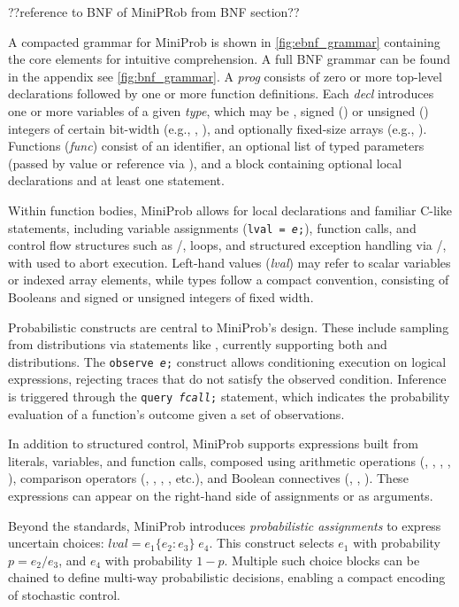 ??reference to BNF of MiniPRob from BNF section??

A compacted grammar for MiniProb is shown in \ref{fig:ebnf_grammar} containing the core elements for intuitive comprehension.
A full BNF grammar can be found in the appendix see \ref{fig:bnf_grammar}.
A \emph{prog} consists of zero or more top-level declarations followed by one or more function definitions. Each \emph{decl} introduces one or more variables of a
given \emph{type}, which may be , signed () or unsigned () integers of certain bit-width (e.g., , ),
and optionally fixed-size arrays (e.g., ). Functions (\emph{func}) consist of an identifier, an optional list of typed parameters (passed by value or
reference via \code{\&}), and a block containing optional local declarations and at least one statement.

Within function bodies, MiniProb allows for local declarations and familiar C-like statements, including variable assignments (\texttt{lval = \emph{e};}),
function calls, and control flow structures such as /,  loops, and structured exception handling via /,
with  used to abort execution. Left-hand values (\emph{lval}) may refer to scalar variables or indexed array elements, while types follow a compact
convention, consisting of Booleans and signed or unsigned integers of fixed width.

Probabilistic constructs are central to MiniProb's design. These include sampling from distributions via statements like ,
currently supporting both  and  distributions. The \texttt{observe \emph{e};} construct allows conditioning execution on logical expressions,
rejecting traces that do not satisfy the observed condition. Inference is triggered through the \texttt{query \emph{fcall};} statement, which indicates
the probability evaluation of a function's outcome given a set of observations.

In addition to structured control, MiniProb supports expressions built from literals, variables, and function calls, composed using arithmetic
operations (\code{+}, \code{-}, \code{*}, \code{/}, \code{\%}), comparison operators (\code{==}, \code{!=}, \code{<}, \code{<=}, etc.), and Boolean connectives
(\code{!}, \code{\&\&}, \code{||}). These expressions can appear on the right-hand side of assignments or as arguments.

Beyond the standards, MiniProb introduces \emph{probabilistic assignments} to express uncertain choices: $lval = e_1 \{ e_2 : e_3 \} \; e_4$.
This construct selects $e_1$ with probability $p = e_2 / e_3$, and $e_4$ with probability $1 - p$.
Multiple such choice blocks can be chained to define multi-way probabilistic decisions, enabling a compact encoding of stochastic control.

